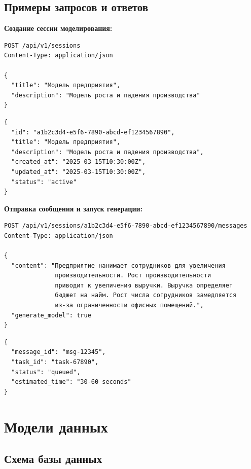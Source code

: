 \subsection{Примеры запросов и ответов}

\textbf{Создание сессии моделирования:}

\begin{lstlisting}[caption={Запрос на создание сессии}, language={}]
POST /api/v1/sessions
Content-Type: application/json

{
  "title": "Модель предприятия",
  "description": "Модель роста и падения производства"
}
\end{lstlisting}

\begin{lstlisting}[caption={Ответ при создании сессии}, language={}]
{
  "id": "a1b2c3d4-e5f6-7890-abcd-ef1234567890",
  "title": "Модель предприятия",
  "description": "Модель роста и падения производства",
  "created_at": "2025-03-15T10:30:00Z",
  "updated_at": "2025-03-15T10:30:00Z",
  "status": "active"
}
\end{lstlisting}

\textbf{Отправка сообщения и запуск генерации:}

\begin{lstlisting}[caption={Запрос на генерацию модели}, language={}]
POST /api/v1/sessions/a1b2c3d4-e5f6-7890-abcd-ef1234567890/messages
Content-Type: application/json

{
  "content": "Предприятие нанимает сотрудников для увеличения
              производительности. Рост производительности
              приводит к увеличению выручки. Выручка определяет
              бюджет на найм. Рост числа сотрудников замедляется
              из-за ограниченности офисных помещений.",
  "generate_model": true
}
\end{lstlisting}

\begin{lstlisting}[caption={Ответ при запуске генерации}, language={}]
{
  "message_id": "msg-12345",
  "task_id": "task-67890",
  "status": "queued",
  "estimated_time": "30-60 seconds"
}
\end{lstlisting}


\section{Модели данных}

\subsection{Схема базы данных}

